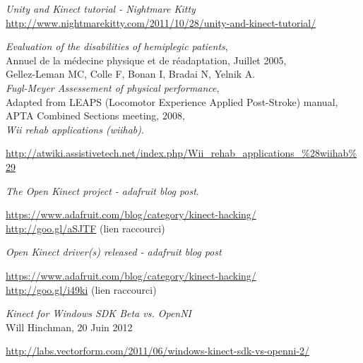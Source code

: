 \begin{thebibliography}{9}


  \emph{Unity and Kinect tutorial - Nightmare Kitty}\\
  \url{http://www.nightmarekitty.com/2011/10/28/unity-and-kinect-tutorial/}

  \emph{Evaluation of the disabilities of hemiplegic patients},\\
  Annuel de la médecine physique et de réadaptation, Juillet 2005,\\
  Gellez-Leman MC, Colle F, Bonan I, Bradai N, Yelnik A.\\
  
  \emph{Fugl-Meyer Assessement of physical performance},\\
  Adapted from LEAPS (Locomotor Experience Applied Post-Stroke) manual,\\
  APTA Combined Sections meeting, 2008,\\

  \emph{Wii rehab applications (wiihab)}.\\
  \begin{small}
  \url{http://atwiki.assistivetech.net/index.php/Wii_rehab_applications_\%28wiihab\%29}
  \end{small}
  
  \emph{The Open Kinect project - adafruit blog post}. \\
  \begin{small}
  \url{https://www.adafruit.com/blog/category/kinect-hacking/}\\
  \url{http://goo.gl/aSJTF} (lien raccourci)
  \end{small}

  \emph{Open Kinect driver(s) released - adafruit blog post}\\
  \begin{small}
  \url{https://www.adafruit.com/blog/category/kinect-hacking/}\\
  \url{http://goo.gl/i49ki} (lien raccourci)
  \end{small}

  \emph{Kinect for Windows SDK Beta vs. OpenNI}\\
  Will Hinchman, 20 Juin 2012\\
  \begin{small}
  \url{http://labs.vectorform.com/2011/06/windows-kinect-sdk-vs-openni-2/}
  \end{small}
  

\end{thebibliography}
